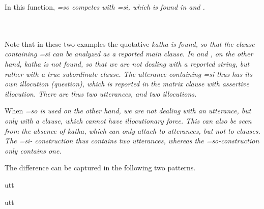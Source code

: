 In this function, \em =so \em competes with \em =si\em, which is found in    and . 

 \\


 \\

Note that in these two examples the quotative \em katha \em is found, so that the clause containing \em =si \em can be analyzed as a reported main clause. In  and , on the other hand, \em katha \em is not found, so that we are not dealing with a reported string, but rather with a true subordinate clause. The utterance containing \em =si \em thus has its own illocution (question), which is reported in the matrix clause with assertive illocution. There are thus two utterances, and two illocutions.

When \em =so \em is used on the other hand, we are not dealing with an utterance, but only with a clause, which cannot have illocutionary force. This can also be seen from the absence of \em katha\em, which can only attach to utterances, but not to clauses. The \em =si\em- construction  thus contains two utterances, whereas the \em =so\em-construction only contains one.

The difference can be captured in the following two patterns.

{utt}
 
{utt}


